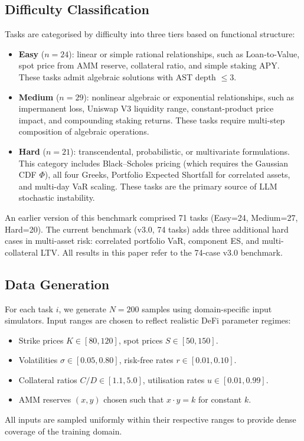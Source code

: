 \documentclass[twoside,11pt]{article}
\begin{document}
\subsection{Difficulty Classification}\label{subsec:difficulty-classification}
\label{sec:bench_difficulty}

Tasks are categorised by difficulty into three tiers based on functional structure:

\begin{itemize}
  \item \textbf{Easy} ($n=24$): linear or simple rational relationships, such as
    Loan-to-Value, spot price from AMM reserve, collateral ratio, and simple staking APY.
    These tasks admit algebraic solutions with AST depth $\le 3$.

  \item \textbf{Medium} ($n=29$): nonlinear algebraic or exponential relationships,
    such as impermanent loss, Uniswap V3 liquidity range, constant-product price impact,
    and compounding staking returns.  These tasks require multi-step composition
    of algebraic operations.

  \item \textbf{Hard} ($n=21$): transcendental, probabilistic, or multivariate
    formulations.  This category includes Black--Scholes pricing (which requires
    the Gaussian CDF $\Phi$), all four Greeks, Portfolio Expected Shortfall for
    correlated assets, and multi-day VaR scaling.  These tasks are the primary
    source of LLM stochastic instability.
\end{itemize}

\begin{remark}
An earlier version of this benchmark comprised 71 tasks (Easy=24, Medium=27,
Hard=20).  The current benchmark (v3.0, 74 tasks) adds three additional hard
cases in multi-asset risk: correlated portfolio VaR, component ES, and
multi-collateral LTV.  All results in this paper refer to the 74-case v3.0 benchmark.
\end{remark}

\subsection{Data Generation}\label{subsec:data-generation}
\label{sec:bench_datagen}

For each task $i$, we generate $N=200$ samples using domain-specific input
simulators.  Input ranges are chosen to reflect realistic DeFi parameter regimes:
\begin{itemize}
  \item Strike prices $K \in [80, 120]$, spot prices $S \in [50, 150]$.
  \item Volatilities $\sigma \in [0.05, 0.80]$, risk-free rates $r \in [0.01, 0.10]$.
  \item Collateral ratios $C/D \in [1.1, 5.0]$, utilisation rates $u \in [0.01, 0.99]$.
  \item AMM reserves $(x, y)$ chosen such that $x \cdot y = k$ for constant $k$.
\end{itemize}
All inputs are sampled uniformly within their respective ranges to provide dense
coverage of the training domain.
\end{document}

